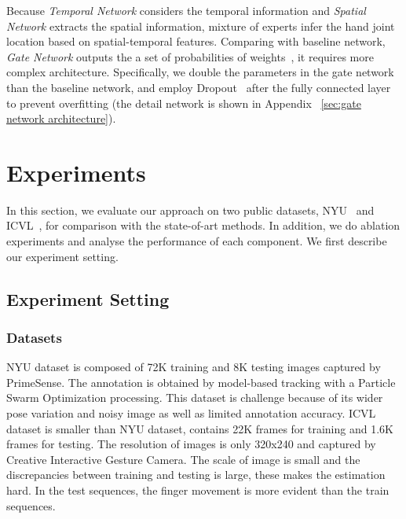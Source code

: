 \documentclass[journal,comsoc]{IEEEtran}
\let\MYoriglatexcaption\caption
\renewcommand{\caption}[2][\relax]{\MYoriglatexcaption[#2]{#2}}
\begin{document}
Because \emph{Temporal Network} considers the temporal information and \emph{Spatial Network}
extracts the spatial information, mixture of experts infer the hand joint location based on
spatial-temporal features. Comparing with baseline network, \emph{Gate Network} outputs the
a set of probabilities of weights~\cite{goodfellow2016deep}, it requires more complex
architecture. Specifically, we double the parameters in the gate network than the baseline
network, and employ Dropout~\cite{srivastava2014dropout} after the fully connected layer
to prevent overfitting (the detail network is shown in Appendix ~\ref{sec:gate network architecture}).




\section{Experiments}\label{sec:experiments}
In this section, we evaluate our approach on two public datasets, NYU~\cite{tompson2014real}
and ICVL~\cite{tang2014latent}, for comparison with the state-of-art methods. In addition, we
do ablation experiments and analyse the performance of each component. We first describe our
experiment setting.

\subsection{Experiment Setting}\label{sec:experiment setting}
\subsubsection{Datasets}\label{sec:datasets}
NYU dataset is composed of 72K training and 8K testing images captured by PrimeSense. The 
annotation is obtained by model-based tracking with a Particle Swarm Optimization processing. 
This dataset is challenge because of its wider pose variation and noisy image as well as limited 
annotation accuracy. ICVL dataset is smaller than NYU dataset, contains 22K frames for training 
and 1.6K frames for testing. The resolution of images is only 320x240 and captured by Creative Interactive 
Gesture Camera. The scale of image is small and the discrepancies between training and testing is 
large, these makes the estimation hard. In the test sequences, the finger movement is more evident 
than the train sequences.
\end{document}
